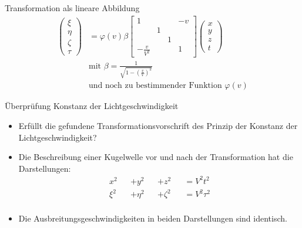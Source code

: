 \documentclass[]{beamer}%
\begin{document}
\begin{frame}{Transformation als lineare Abbildung}
    \begin{align*}
        \begin{pmatrix}
            \xi \\
            \eta \\
            \zeta\\
            \tau
        \end{pmatrix}
    &=
    \varphi \left( v \right) \beta
        \begin{bmatrix}
             1
            &
            &
            &-v
            \\%
            &1
            &
            &
            \\%
            &
            &1
            &
            \\%
             -\frac{v}{V^2}
            &
            &
            &1
        \end{bmatrix}
        \begin{pmatrix}
            x\\y\\z\\t
        \end{pmatrix}\\[30pt]
            &\text{mit }\beta =\frac{1}{\sqrt{1-\left( \frac{v}{V} \right)^2}}\\
            &\text{und noch zu bestimmender Funktion }\varphi \left( v \right)
    \end{align*}
\end{frame}

\begin{frame}{Überprüfung Konstanz der Lichtgeschwindigkeit}
    \begin{itemize}
        \item Erfüllt die gefundene Transformationsvorschrift des Prinzip der
                Konstanz der Lichtgeschwindigkeit?
        \item Die Beschreibung einer Kugelwelle vor und nach der Transformation
                hat die Darstellungen:
            \begin{align*}
                x^2 &&+y^2&&+z^2&&=V^2t^2\\
                \xi^2 &&+\eta^2&&+\zeta^2&&=V^2\tau^2\\
            \end{align*}
        \item Die Ausbreitungsgeschwindigkeiten in beiden Darstellungen sind identisch.
    \end{itemize}
\end{frame}
\end{document}
